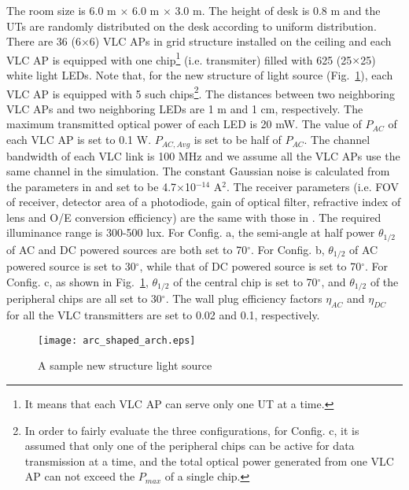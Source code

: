 \documentclass[10pt,journal]{IEEEtran}
\begin{document}
The room size is 6.0 m $\times$ 6.0 m $\times$ 3.0 m. The height of desk is 0.8 m and the UTs are randomly distributed on the desk according to uniform distribution. There are 36 (6$\times$6) VLC APs in grid structure installed on the ceiling and each VLC AP is equipped with one chip\footnote{It means that each VLC AP can serve only one UT at a time.} (i.e. transmiter) filled with 625 (25$\times$25) white light LEDs. Note that, for the new structure of light source (Fig.~\ref{fig_acr_shaped_arch}), each VLC AP is equipped with 5 such chips\footnote{In order to fairly evaluate the three configurations, for Config. c, it is assumed that only one of the peripheral chips can be active for data transmission at a time, and the total optical power generated from one VLC AP can not exceed the $P_{max}$ of a single chip.}. The distances between two neighboring VLC APs and two neighboring LEDs are 1 m and 1 cm, respectively. The maximum transmitted optical power of each LED is 20 mW. The value of $P_{AC}$ of each VLC AP is set to 0.1 W. $P_{AC,Avg}$ is set to be half of $P_{AC}$. The channel bandwidth of each VLC link is 100 MHz and we assume all the VLC APs use the same channel in the simulation. The constant Gaussian noise is calculated from the parameters in \cite {komine2004fundamental} and set to be 4.7$\times$10$^{-14}$ A$^{2}$. The receiver parameters (i.e. FOV of receiver, detector area of a photodiode, gain of optical filter, refractive index of lens and O/E conversion efficiency) are the same with those in \cite {komine2004fundamental}. The required illuminance range is 300-500 lux. For Config. a, the semi-angle at half power $\theta_{1/2}$ of AC and DC powered sources are both set to 70$^\circ$. For Config. b, $\theta_{1/2}$ of AC powered source is set to 30$^\circ$, while that of DC powered source is set to 70$^\circ$. For Config. c, as shown in Fig.~\ref{fig_acr_shaped_arch}, $\theta_{1/2}$ of the central chip is set to 70$^\circ$, and $\theta_{1/2}$ of the peripheral chips are all set to 30$^\circ$. The wall plug efficiency factors $\eta_{AC}$ and $\eta_{DC}$ for all the VLC transmitters are set to 0.02 and 0.1, respectively.

\begin{figure}
\centering
\texttt{[image: arc\_shaped\_arch.eps]}
\caption{A sample new structure light source}
\label{fig_acr_shaped_arch}
\end{figure}
\end{document}
